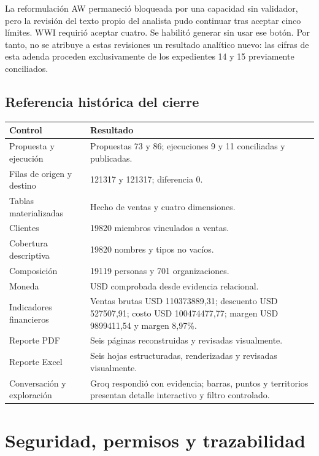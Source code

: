 \documentclass[11pt,letterpaper]{article}
\begin{document}
La reformulación AW permaneció bloqueada por una capacidad sin validador, pero la
revisión del texto propio del analista pudo continuar tras aceptar cinco límites.
WWI requirió aceptar cuatro. Se habilitó generar sin usar ese botón. Por tanto, no
se atribuye a estas revisiones un resultado analítico nuevo: las cifras de esta
adenda proceden exclusivamente de los expedientes 14 y 15 previamente conciliados.

\subsection{Referencia histórica del cierre}

\begin{tabularx}{\textwidth}{@{}p{}X@{}}
  \toprule
  Control & Resultado \\
  \midrule
  Propuesta y ejecución & Propuestas 73 y 86; ejecuciones 9 y 11 conciliadas y publicadas. \\
  Filas de origen y destino & 121317 y 121317; diferencia 0. \\
  Tablas materializadas & Hecho de ventas y cuatro dimensiones. \\
  Clientes & 19820 miembros vinculados a ventas. \\
  Cobertura descriptiva & 19820 nombres y tipos no vacíos. \\
  Composición & 19119 personas y 701 organizaciones. \\
  Moneda & USD comprobada desde evidencia relacional. \\
  Indicadores financieros & Ventas brutas USD 110373889,31; descuento USD 527507,91; costo USD 100474477,77; margen USD 9899411,54 y margen 8,97\%. \\
  Reporte PDF & Seis páginas reconstruidas y revisadas visualmente. \\
  Reporte Excel & Seis hojas estructuradas, renderizadas y revisadas visualmente. \\
  Conversación y exploración & Groq respondió con evidencia; barras, puntos y territorios presentan detalle interactivo y filtro controlado. \\
  \bottomrule
\end{tabularx}

\section{Seguridad, permisos y trazabilidad}
\end{document}
